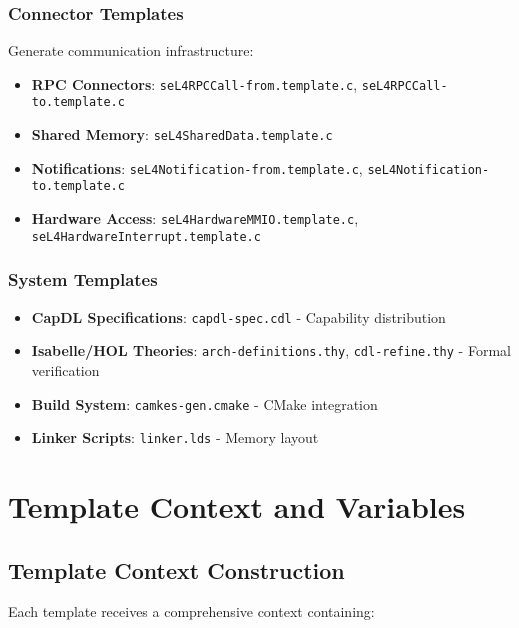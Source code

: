 \documentclass[12pt,a4paper]{article}
\begin{document}
\subsubsection{Connector Templates}
Generate communication infrastructure:

\begin{itemize}
    \item \textbf{RPC Connectors}: \texttt{seL4RPCCall-from.template.c}, \texttt{seL4RPCCall-to.template.c}
    \item \textbf{Shared Memory}: \texttt{seL4SharedData.template.c}
    \item \textbf{Notifications}: \texttt{seL4Notification-from.template.c}, \texttt{seL4Notification-to.template.c}
    \item \textbf{Hardware Access}: \texttt{seL4HardwareMMIO.template.c}, \texttt{seL4HardwareInterrupt.template.c}
\end{itemize}

\subsubsection{System Templates}
\begin{itemize}
    \item \textbf{CapDL Specifications}: \texttt{capdl-spec.cdl} - Capability distribution
    \item \textbf{Isabelle/HOL Theories}: \texttt{arch-definitions.thy}, \texttt{cdl-refine.thy} - Formal verification
    \item \textbf{Build System}: \texttt{camkes-gen.cmake} - CMake integration
    \item \textbf{Linker Scripts}: \texttt{linker.lds} - Memory layout
\end{itemize}

\section{Template Context and Variables}

\subsection{Template Context Construction}
Each template receives a comprehensive context containing:
\end{document}
